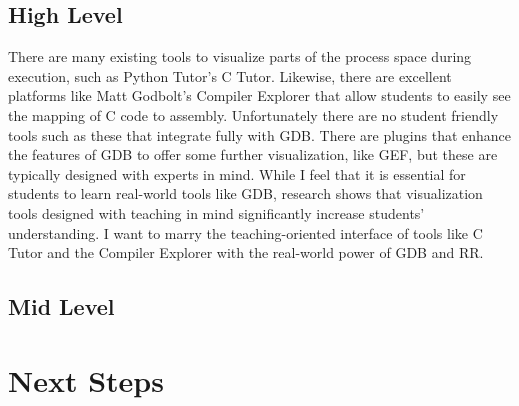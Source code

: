 \documentclass[12pt]{article}
\begin{document}
\subsection{High Level}

There are many existing tools to visualize parts of the process space
during execution, such as Python Tutor's C Tutor\cite{pythontutor}.
Likewise, there are excellent platforms like Matt Godbolt's Compiler
Explorer\cite{godbolt} that allow students to easily see the mapping
of C code to assembly.  Unfortunately there are no student friendly
tools such as these that integrate fully with GDB.  There are plugins
that enhance the features of GDB to offer some further visualization,
like GEF\cite{gef}, but these are typically designed with experts in
mind.  While I feel that it is essential for students to learn
real-world tools like GDB, research shows that visualization tools
designed with teaching in mind significantly increase students'
understanding\cite{10.1145/3328778.3366894}.  I want to marry the
teaching-oriented interface of tools like C Tutor and the Compiler
Explorer with the real-world power of GDB and RR.

\subsection{Mid Level}

\section{Next Steps}

\pagebreak

{}
\end{document}
